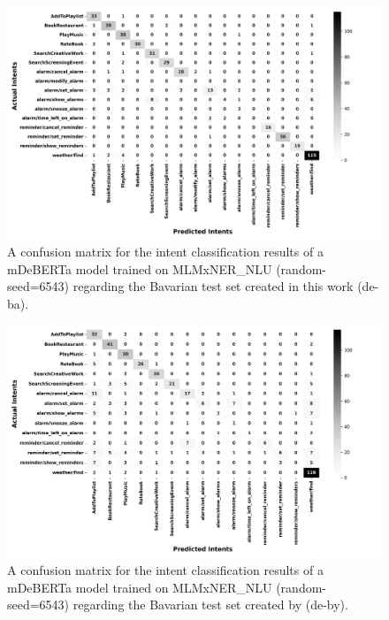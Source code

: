 \documentclass[11pt,a4paper,twoside,openright]{scrbook}
\begin{document}
\begin{figure}[!ht]
    \centering
    \includegraphics[width=\textwidth]{ma_figures/de-ba_MLMxNER_NLU.png}
    \caption{A confusion matrix for the intent classification results of a mDeBERTa model trained on MLMxNER\_NLU (random-seed=6543) regarding the Bavarian test set created in this work (de-ba).}
    \label{fig:de-ba_MLMxNER_NLU}
\end{figure}

\begin{figure}[!ht]
    \centering
    \includegraphics[width=\textwidth]{ma_figures/de-by_MLMxNER_NLU.png}
    \caption{A confusion matrix for the intent classification results of a mDeBERTa model trained on MLMxNER\_NLU (random-seed=6543) regarding the Bavarian test set created by \citet{winkler-etal-2024-slot-intent} (de-by).}
    \label{fig:de-by_MLMxNER_NLU}
\end{figure}
\end{document}
